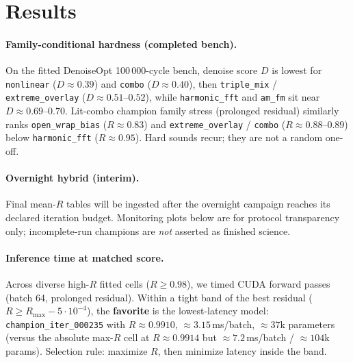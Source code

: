 \section{Results}
\label{sec:results}

\paragraph{Family-conditional hardness (completed bench).}
On the fitted DenoiseOpt 100\,000-cycle bench, denoise score $D$ is lowest for \texttt{nonlinear} ($D\approx 0.39$) and \texttt{combo} ($D\approx 0.40$), then \texttt{triple\_mix} / \texttt{extreme\_overlay} ($D\approx 0.51$--$0.52$), while \texttt{harmonic\_fft} and \texttt{am\_fm} sit near $D\approx 0.69$--$0.70$.
Lit-combo champion family stress (prolonged residual) similarly ranks \texttt{open\_wrap\_bias} ($R\approx 0.83$) and \texttt{extreme\_overlay} / \texttt{combo} ($R\approx 0.88$--$0.89$) below \texttt{harmonic\_fft} ($R\approx 0.95$).
Hard sounds recur; they are not a random one-off.

\paragraph{Overnight hybrid (interim).}
Final mean-$R$ tables will be ingested after the overnight campaign reaches its declared iteration budget.
Monitoring plots below are for protocol transparency only; incomplete-run champions are \emph{not} asserted as finished science.

\paragraph{Inference time at matched score.}
Across diverse high-$R$ fitted cells ($R\ge 0.98$), we timed CUDA forward passes (batch 64, prolonged residual).
Within a tight band of the best residual ($R \ge R_{\max}-5\cdot10^{-4}$), the \textbf{favorite} is the lowest-latency model:
\texttt{champion\_iter\_000235} with $R\approx 0.9910$, $\approx 3.15$\,ms/batch, $\approx 37$k parameters
(versus the absolute max-$R$ cell at $R\approx 0.9914$ but $\approx 7.2$\,ms/batch / $\approx 104$k params).
Selection rule: maximize $R$, then minimize latency inside the band.


